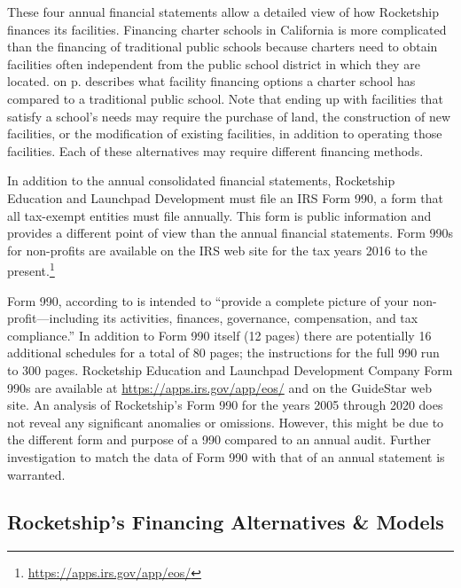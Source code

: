 These four annual financial statements allow a detailed view of how Rocketship finances its facilities. Financing charter schools in California is more complicated than the financing of traditional public schools because charters need to obtain facilities often independent from the public school district in which they are located.
 on p.\pageref{tab:charter-school-financing} describes what facility financing options a charter school has compared to a traditional public school. Note that ending up with facilities that satisfy a school's needs may require the purchase of land, the construction of new facilities, or the modification of existing facilities, in addition to operating those facilities. Each of these alternatives may require different financing methods.

In addition to the annual consolidated financial statements, Rocketship Education and Launchpad Development must file an IRS Form 990, a form that all tax-exempt entities must file annually. This form is  public information and provides a different point of view than the annual financial statements. Form 990s for non-profits are available on the IRS web site for the tax years 2016 to the present.\footnote{\url{https://apps.irs.gov/app/eos/}}

Form 990, according to \citeauthor{Fishman2022} is intended to ``provide a complete picture of your non-profit—including its activities, finances, governance, compensation, and tax compliance.'' \parencite[84]{Fishman2022} In addition to Form 990 itself (12 pages) there are potentially 16 additional schedules for a total of 80 pages; the instructions for the full 990 run to 300 pages. Rocketship Education and Launchpad Development Company Form 990s are available at \url{https://apps.irs.gov/app/eos/} and on the GuideStar web site. An analysis of Rocketship's Form 990 for the years 2005 through 2020 does not reveal any significant anomalies or omissions. However, this might be due to the different form and purpose of a 990 compared to an annual audit. Further investigation to match the data of Form 990 with that of an annual statement is warranted.

\subsection{Rocketship's Financing Alternatives \& Models}\label{sec:rocketship-financial-alternatives}\indent%


